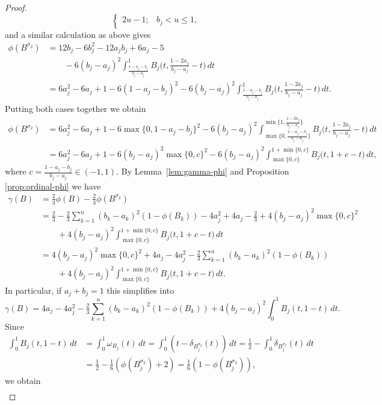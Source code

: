 \documentclass[10pt,a4paper]{amsart}
\begin{document}
\begin{proof}
$$\begin{cases}
		2u-1; &  b_j < u \le 1,
    \end{cases}$$
and a similar calculation as above gives
\begin{align*}
\phi(B^{\sigma_2}) &= 12b_j-6b_j^2-12a_jb_j+6a_j-5 \\
&\qquad- 6(b_j-a_j)^2\int_{\frac{1-a_j-b_j}{b_j-a_j}}^{1} B_j\big(t, \tfrac{1-2a_j}{b_j-a_j}-t\big) \, dt \\
&=6a_j^2-6a_j+1-6(1-a_j-b_j)^2 - 6(b_j-a_j)^2\int_{\frac{1-a_j-b_j}{b_j-a_j}}^{1} B_j\big(t, \tfrac{1-2a_j}{b_j-a_j}-t\big) \, dt.
\end{align*}
Putting both cases together we obtain
\begin{align*}
    \phi(B^{\sigma_2}) &= 6a_j^2-6a_j+1-6\max\{0,1-a_j-b_j\}^2 - 6(b_j-a_j)^2\int_{\max\big\{0,\frac{1-a_j-b_j}{b_j-a_j}\big\}}^{\min\big\{1,\frac{1-2a_j}{b_j-a_j}\big\}} B_j\big(t, \tfrac{1-2a_j}{b_j-a_j}-t\big) \, dt\\
&=6a_j^2-6a_j+1-6(b_j-a_j)^2\max\{0,c\}^2- 6(b_j-a_j)^2\int_{\max\{0,c\}}^{1+\min\{0,c\}} B_j\big(t,1+c-t\big) \, dt,
\end{align*}
where $c=\frac{1-a_j-b_j}{b_j-a_j} \in (-1,1)$.
By Lemma~\ref{lem:gamma-phi} and Proposition \ref{prop:ordinal-phi} we have
\begin{align*}
   \gamma(B) &= \tfrac23 \phi(B) - \tfrac23 \phi(B^{\sigma_2}) \\
   &= \tfrac23 - \tfrac23\sum_{k=1}^n (b_k-a_k)^2(1-\phi(B_k)) - 4a_j^2 + 4a_j - \tfrac23+4(b_j-a_j)^2\max\{0,c\}^2  \\
   &\qquad+ 4(b_j-a_j)^2\int_{\max\{0,c\}}^{1+\min\{0,c\}} B_j\big(t,1+c-t\big) \, dt \\
   &= 4(b_j-a_j)^2\max\{0,c\}^2 + 4a_j - 4a_j^2 - \tfrac23\sum_{k=1}^n (b_k-a_k)^2(1-\phi(B_k)) \\
   &\qquad+ 4(b_j-a_j)^2\int_{\max\{0,c\}}^{1+\min\{0,c\}} B_j\big(t,1+c-t\big) \, dt. 
\end{align*}
In particular, if $a_j+b_j=1$ this simplifies into
$$\gamma(B) = 4a_j - 4a_j^2 - \tfrac23\sum_{k=1}^n (b_k-a_k)^2(1-\phi(B_k)) + 4(b_j-a_j)^2\int_0^1 B_j(t, 1-t) \, dt. $$
Since 
\begin{align*}
\int_0^1 B_j(t, 1-t) \, dt &= \int_0^1 \omega_{B_j}(t) \, dt = \int_0^1 (t-\delta_{B_j^{\sigma_2}}(t)) \, dt = \tfrac12-\int_0^1 \delta_{B_j^{\sigma_2}}(t) \, dt \\
&= \tfrac12-\tfrac16(\phi(B_j^{\sigma_2})+2) = \tfrac16(1-\phi(B_j^{\sigma_2})),
\end{align*}
we obtain
\begin{align*}

\end{align*}
\end{proof}
\end{document}
